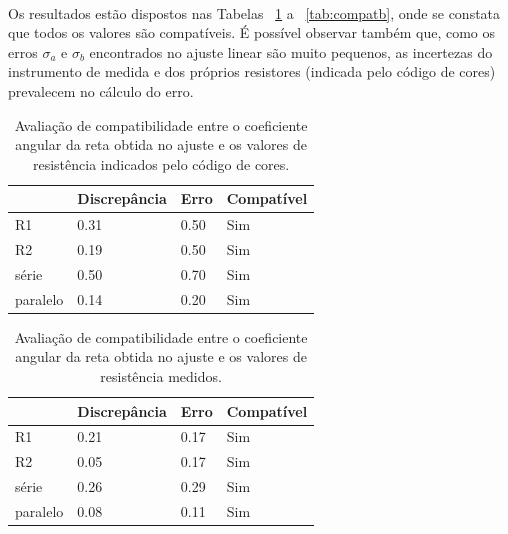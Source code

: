 \documentclass[11pt,a4paper]{article}
\begin{document}
      \paragraph{}
      Os resultados estão dispostos nas Tabelas ~\ref{tab:compatajcc} a ~\ref{tab:compatb}, onde se constata que todos os valores são compatíveis. É possível observar também que, como os erros  $\sigma_{a}$ e $\sigma_{b}$ encontrados no ajuste linear são muito pequenos, as incertezas do instrumento de medida e dos próprios resistores (indicada pelo código de cores) prevalecem no cálculo do erro.

       \begin{table}[htb!]
        \centering
        \begin{tabular}{llll}
        \toprule
                   & Discrepância      & Erro & Compatível                          \\
          \midrule
          R1       & 0.31              & 0.50 & {\color[HTML]{009901} Sim}          \\
          R2       & 0.19              & 0.50 & {\color[HTML]{009901} Sim}          \\
          série    & 0.50              & 0.70 & {\color[HTML]{009901} Sim}          \\
          paralelo & 0.14              & 0.20 & {\color[HTML]{009901} Sim}          \\
          \bottomrule
          
        \end{tabular}
        \caption{Avaliação de compatibilidade entre o coeficiente angular da reta obtida no ajuste e os valores de resistência indicados pelo código de cores.}
        \label{tab:compatajcc}
        \end{table}
        
      \begin{table}[htb!]
        \centering
        \begin{tabular}{llll}
        \toprule
                   & Discrepância      & Erro & Compatível                          \\
          \midrule
          R1       & 0.21              & 0.17 & {\color[HTML]{009901} Sim}          \\
          R2       & 0.05              & 0.17 & {\color[HTML]{009901} Sim}          \\
          série    & 0.26              & 0.29 & {\color[HTML]{009901} Sim}          \\
          paralelo & 0.08              & 0.11 & {\color[HTML]{009901} Sim}          \\ 
          \bottomrule
          
        \end{tabular}
        \caption{Avaliação de compatibilidade entre o coeficiente angular da reta obtida no ajuste e os valores de resistência medidos.}
        \label{tab:compatajdig}
      \end{table}
      
\end{document}
